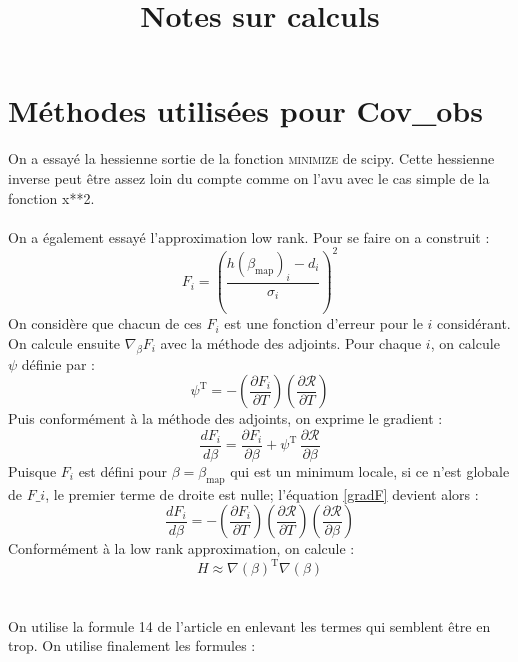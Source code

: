 \documentclass[a4paper,12pt]{article}
\title{\color{red}Notes sur calculs \color{black}}%
\date{}
\newcommand{\bepar}[1]{
	\left( #1 \right)  
}
\numberwithin{equation}{section} %
\begin{document}
\section{Méthodes utilisées pour Cov\_obs}
On a essayé la hessienne sortie de la fonction \textsc{minimize} de scipy. Cette hessienne inverse peut être assez loin du compte comme on l'avu avec le cas simple de la fonction x**2.\\\\
On a également essayé l'approximation low rank. Pour se faire on a construit :
 \begin{equation}
 F_i = \left(\frac{h(\beta_{\text{map}})_i - d_i}{\sigma_i}\right)^2
 \end{equation}
On considère que chacun de ces $F_i$ est une fonction d'erreur pour le $i$ considérant. \\
On calcule ensuite $\displaystyle \nabla_\beta F_i$ avec la méthode des adjoints. Pour chaque $i$, on calcule $\psi$ définie par :
 \begin{equation}
 \psi^{\text{T}} = -\bepar{\frac{\partial F_i}{\partial T}} \bepar{\frac{\partial \mathcal{R}}{\partial T}}
 \end{equation}
 Puis conformément à la méthode des adjoints, on exprime le gradient :
 \begin{equation}
 \frac{dF_i}{d\beta} = \frac{\partial F_i}{\partial \beta} + \psi^{\text{T}}\, \frac{\partial \mathcal{R}}{\partial \beta} \label{gradF}
 \end{equation}
 Puisque $F_i$ est défini pour $\beta = \beta_{\text{map}}$ qui est un minimum locale, si ce n'est globale de $F\_i$, le premier terme de droite est nulle; l'équation \eqref{gradF} devient alors :
  \begin{equation}
 \frac{dF_i}{d\beta} = -\bepar{\frac{\partial F_i}{\partial T}} \bepar{\frac{\partial \mathcal{R}}{\partial T}} \bepar{\frac{\partial \mathcal{R}}{\partial \beta}}
 \end{equation}
 Conformément à la low rank approximation, on calcule :
 \begin{equation}
 H \approx \nabla(\beta)^{\text{T}} \nabla(\beta)
 \end{equation} \\\\
 On utilise la formule 14 de l'article en enlevant les termes qui semblent être en trop. On utilise finalement les formules :
\end{document}
